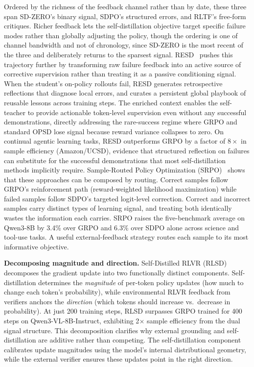 \documentclass{article} %
\begin{document}
Ordered by the richness of the feedback channel rather than by date, these three span SD-ZERO's binary signal, SDPO's structured errors, and RLTF's free-form critiques. Richer feedback lets the self-distillation objective target specific failure modes rather than globally adjusting the policy, though the ordering is one of channel bandwidth and not of chronology, since SD-ZERO is the most recent of the three and deliberately returns to the sparsest signal. RESD~\citep{2605.12741} pushes this trajectory further by transforming raw failure feedback into an active source of corrective supervision rather than treating it as a passive conditioning signal. When the student's on-policy rollouts fail, RESD generates retrospective reflections that diagnose local errors, and curates a persistent global playbook of reusable lessons across training steps. The enriched context enables the self-teacher to provide actionable token-level supervision even without any successful demonstrations, directly addressing the rare-success regime where GRPO and standard OPSD lose signal because reward variance collapses to zero. On continual agentic learning tasks, RESD outperforms GRPO by a factor of $8\times$ in sample efficiency (Amazon/UCSD), evidence that structured reflection on failures can substitute for the successful demonstrations that most self-distillation methods implicitly require. Sample-Routed Policy Optimization (SRPO)~\citep{2604.02288} shows that these approaches can be composed by routing. Correct samples follow GRPO's reinforcement path (reward-weighted likelihood maximization) while failed samples follow SDPO's targeted logit-level correction. Correct and incorrect samples carry distinct types of learning signal, and treating both identically wastes the information each carries. SRPO raises the five-benchmark average on Qwen3-8B by 3.4\% over GRPO and 6.3\% over SDPO alone across science and tool-use tasks. A useful external-feedback strategy routes each sample to its most informative objective.

\textbf{Decomposing magnitude and direction.} Self-Distilled RLVR (RLSD)~\citep{2604.03128} decomposes the gradient update into two functionally distinct components. Self-distillation determines the \emph{magnitude} of per-token policy updates (how much to change each token's probability), while environmental RLVR feedback from verifiers anchors the \emph{direction} (which tokens should increase vs.\ decrease in probability). At just 200 training steps, RLSD surpasses GRPO trained for 400 steps on Qwen3-VL-8B-Instruct, exhibiting 2$\times$ sample efficiency from the dual signal structure. This decomposition clarifies why external grounding and self-distillation are additive rather than competing. The self-distillation component calibrates update magnitudes using the model's internal distributional geometry, while the external verifier ensures these updates point in the right direction.
\end{document}
